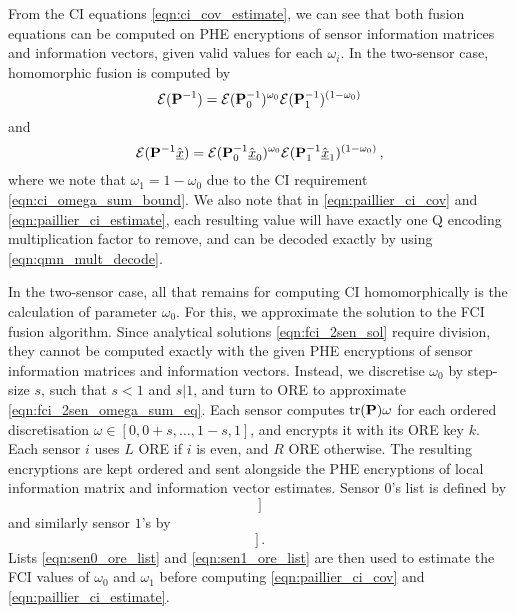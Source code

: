 \documentclass[letterpaper, 10 pt, conference]{ieeeconf}  %
\begin{document}
From the CI equations \eqref{eqn:ci_cov_estimate}, we can see that both fusion equations can be computed on PHE encryptions of sensor information matrices and information vectors, given valid values for each $\omega_i$. In the two-sensor case, homomorphic fusion is computed by
\begin{equation}
   \mathcal{E}({{\mathbf{P}}}^{-1}) = \mathcal{E}({{\mathbf{P}}}^{-1}_0)^{\omega_0}\mathcal{E}({{\mathbf{P}}}^{-1}_1)^{(1 -\omega_0)} \label{eqn:paillier_ci_cov}
\end{equation}
and
\begin{equation}
   \mathcal{E}({{\mathbf{P}}}^{-1}\hat{{\underline{x}}}) = \mathcal{E}({{\mathbf{P}}}^{-1}_0\hat{{\underline{x}}}_0)^{\omega_0}\mathcal{E}({{\mathbf{P}}}^{-1}_1\hat{{\underline{x}}}_1)^{(1 - \omega_0)}\,, \label{eqn:paillier_ci_estimate}
\end{equation}
where we note that $\omega_1=1-\omega_0$ due to the CI requirement \eqref{eqn:ci_omega_sum_bound}. We also note that in \eqref{eqn:paillier_ci_cov} and \eqref{eqn:paillier_ci_estimate}, each resulting value will have exactly one Q encoding multiplication factor to remove, and can be decoded exactly by using \eqref{eqn:qmn_mult_decode}.
   
In the two-sensor case, all that remains for computing CI homomorphically is the calculation of parameter $\omega_0$. For this, we approximate the solution to the FCI fusion algorithm. Since analytical solutions \eqref{eqn:fci_2sen_sol} require division, they cannot be computed exactly with the given PHE encryptions of sensor information matrices and information vectors. Instead, we discretise $\omega_0$ by step-size $s$, such that $s<1$ and $s|1$, and turn to ORE to approximate \eqref{eqn:fci_2sen_omega_sum_eq}. Each sensor computes $\operatorname{tr}({{\mathbf{P}}})\omega$ for each ordered discretisation $\omega \in [0,0+s,\dots,1-s,1]$, and encrypts it with its ORE key $k$. Each sensor $i$ uses $L$ ORE if $i$ is even, and $R$ ORE otherwise. The resulting encryptions are kept ordered and sent alongside the PHE encryptions of local information matrix and information vector estimates. Sensor $0$'s list is defined by 
\begin{equation}
   [\mathcal{E}^L_{ORE}(\omega\tr(\mP_0)),\ \omega \in [0,0+s,\dots,1-s,1]] \label{eqn:sen0_ore_list}
\end{equation}
and similarly sensor $1$'s by
\begin{equation}
   [\mathcal{E}^R_{ORE}(\omega\tr(\mP_1)),\ \omega \in [0,0+s,\dots,1-s,1]]\,. \label{eqn:sen1_ore_list}
\end{equation}
Lists \eqref{eqn:sen0_ore_list} and \eqref{eqn:sen1_ore_list} are then used to estimate the FCI values of $\omega_0$ and $\omega_1$ before computing \eqref{eqn:paillier_ci_cov} and \eqref{eqn:paillier_ci_estimate}.
\end{document}
